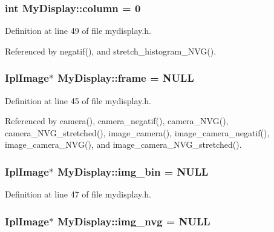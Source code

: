 \hypertarget{classMyDisplay_a94a51f56cd8e8c5b6e22f5634b5d5f12}{
\subsubsection[{column}]{\setlength{\rightskip}{0pt plus 5cm}int My\-Display\-::column = 0\hspace{0.3cm}{\ttfamily [private]}}}\label{classMyDisplay_a94a51f56cd8e8c5b6e22f5634b5d5f12}


Definition at line 49 of file mydisplay.\-h.



Referenced by negatif(), and stretch\-\_\-histogram\-\_\-\-N\-V\-G().

\hypertarget{classMyDisplay_aee26cb4ae47e963a1491466d08a27d0c}{
\subsubsection[{frame}]{\setlength{\rightskip}{0pt plus 5cm}Ipl\-Image$\ast$ My\-Display\-::frame = N\-U\-L\-L\hspace{0.3cm}{\ttfamily [private]}}}\label{classMyDisplay_aee26cb4ae47e963a1491466d08a27d0c}


Definition at line 45 of file mydisplay.\-h.



Referenced by camera(), camera\-\_\-negatif(), camera\-\_\-\-N\-V\-G(), camera\-\_\-\-N\-V\-G\-\_\-stretched(), image\-\_\-camera(), image\-\_\-camera\-\_\-negatif(), image\-\_\-camera\-\_\-\-N\-V\-G(), and image\-\_\-camera\-\_\-\-N\-V\-G\-\_\-stretched().

\hypertarget{classMyDisplay_aaa25208b5bfada51a5ac878f76453f44}{
\subsubsection[{img\-\_\-bin}]{\setlength{\rightskip}{0pt plus 5cm}Ipl\-Image$\ast$ My\-Display\-::img\-\_\-bin = N\-U\-L\-L\hspace{0.3cm}{\ttfamily [private]}}}\label{classMyDisplay_aaa25208b5bfada51a5ac878f76453f44}


Definition at line 47 of file mydisplay.\-h.

\hypertarget{classMyDisplay_a66ed19ac74896c2fef063f853a80416f}{
\subsubsection[{img\-\_\-nvg}]{\setlength{\rightskip}{0pt plus 5cm}Ipl\-Image$\ast$ My\-Display\-::img\-\_\-nvg = N\-U\-L\-L\hspace{0.3cm}{\ttfamily [private]}}}\label{classMyDisplay_a66ed19ac74896c2fef063f853a80416f}


